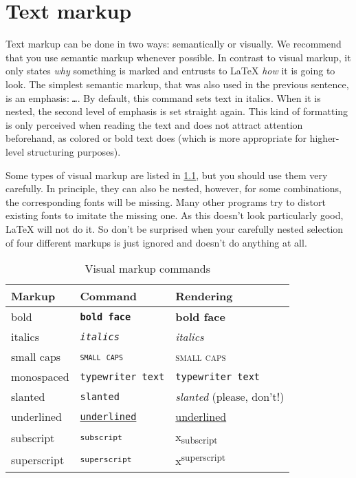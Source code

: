 \chapter{Text markup}

Text markup can be done in two ways: semantically or visually.
We recommend that you use semantic markup whenever possible.
In contrast to visual markup, it only states \emph{why} something is marked and entrusts to \LaTeX{} \emph{how} it is going to look.
The simplest semantic markup, that was also used in the previous sentence, is an emphasis: \texttt{\emph{…}}.
By default, this command sets text in italics.
When it is nested, the second level of emphasis is set straight again.
This kind of formatting is only perceived when reading the text and does not attract attention beforehand, as colored or bold text does (which is more appropriate for higher-level structuring purposes).

Some types of visual markup are listed in \cref{tbl:visual-markup}, but you should use them very carefully.
In principle, they can also be nested, however, for some combinations, the corresponding fonts will be missing.
Many other programs try to distort existing fonts to imitate the missing one.
As this doesn’t look particularly good, \LaTeX{} will not do it.
So don’t be surprised when your carefully nested selection of four different markups is just ignored and doesn’t do anything at all.

\begin{table}[H]
	\center
	\begin{tabular}{lll}
		\toprule
		Markup & Command & Rendering \\
		\midrule
		bold & \texttt{\textbf{bold face}} & \textbf{bold face} \\
		italics & \texttt{\textit{italics}} & \textit{italics} \\
		small caps & \texttt{\textsc{small caps}} & \textsc{small caps} \\
		monospaced & \texttt{\texttt{typewriter text}} & \texttt{typewriter text} \\
		slanted & \texttt{\texttt{slanted}} & \textsl{slanted} (please, don’t!) \\
		underlined & \texttt{\underline{underlined}} & \underline{underlined} \\
		subscript & \texttt{\textsubscript{subscript}} & x\textsubscript{subscript} \\
		superscript & \texttt{\textsubscript{superscript}} & x\textsuperscript{superscript} \\
		\bottomrule
	\end{tabular}
	\caption{Visual markup commands}
	\label{tbl:visual-markup}
\end{table}

